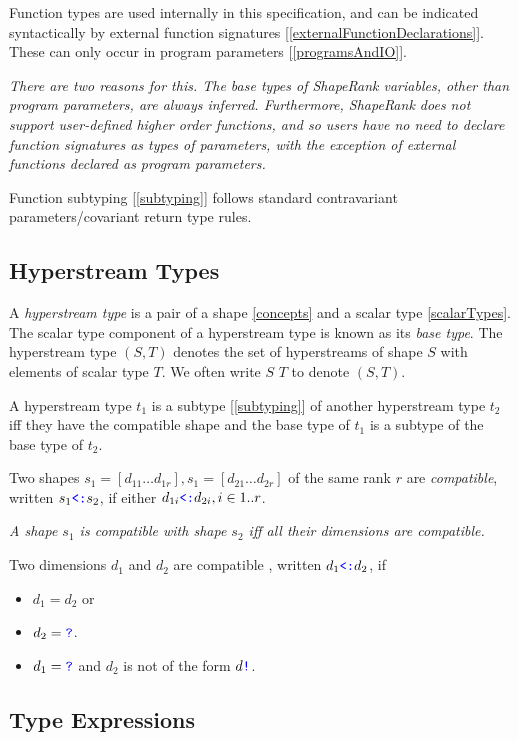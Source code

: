 \documentclass{article}
\begin{document}
Function types are used internally in this specification, and can be indicated syntactically by external function signatures [\ref{externalFunctionDeclarations}]. These can only occur in program parameters [\ref{programsAndIO}].

{\em 
There are two reasons for this.  The base types of ShapeRank variables, other than program parameters, are always inferred. Furthermore, ShapeRank does not support user-defined higher order functions, and so users have no need to declare function signatures as types of parameters,
with the exception of external functions declared as program parameters.
}

Function subtyping [\ref{subtyping}] follows standard contravariant parameters/covariant return type rules. 


\subsection{Hyperstream Types}
\label{hyperstreamTypes} 

A {\em hyperstream type} is a pair of a shape \ref{concepts} and a scalar type \ref{scalarTypes}. The scalar type component of a hyperstream type is known as its {\em base type}. The hyperstream type $(S,  T)$ denotes the set of hyperstreams of shape $S$ with elements of scalar type $T$. We often write $S$ $T$ to denote $(S,  T)$.

A hyperstream type $t_1$ is a subtype [\ref{subtyping}]  of another hyperstream type $t_2$ iff they have the compatible shape and the base type of $t_1$ is a subtype of the base type of $t_2$. 

Two shapes $s_1 = [d_{11} \ldots d_{1r}], s_1 = [d_{21} \ldots d_{2r}]$ of the same rank $r$ are {\em compatible}, written $s_1 \texttt{\color{blue} \tt<:} s_2$, if either $d_{1i} \texttt{\color{blue} \tt<:} d_{2i}, i \in 1..r$.

{\em 
A shape $s_1$ is compatible with shape $s_2$ iff all their dimensions are compatible.
}

 Two dimensions $d_1$ and $d_2$ are compatible , written $d_1 \texttt{\color{blue} \tt<:} d_2$, if 
\begin{itemize}
\item  $d_1 = d_2$ or 
\item $d_2 = \texttt{\color{blue} ?}$.
\item $d_1 = \texttt{\color{blue} ?}$ and $d_2$ is not of the form $d\texttt{\color{blue} !}$.
\end{itemize}


\subsection{Type Expressions}
\label{typeExpressions}
\end{document}
